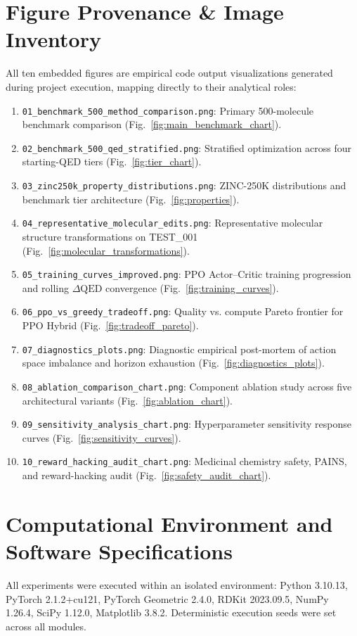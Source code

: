 \documentclass{ieeeaccess}
\begin{document}
\appendices
\section{Figure Provenance \& Image Inventory}
\label{sec:appendix_figures}
All ten embedded figures are empirical code output visualizations generated during project execution, mapping directly to their analytical roles:
\begin{enumerate}
    \item \texttt{01\_benchmark\_500\_method\_comparison.png}: Primary 500-molecule benchmark comparison (Fig.~\ref{fig:main_benchmark_chart}).
    \item \texttt{02\_benchmark\_500\_qed\_stratified.png}: Stratified optimization across four starting-QED tiers (Fig.~\ref{fig:tier_chart}).
    \item \texttt{03\_zinc250k\_property\_distributions.png}: ZINC-250K distributions and benchmark tier architecture (Fig.~\ref{fig:properties}).
    \item \texttt{04\_representative\_molecular\_edits.png}: Representative molecular structure transformations on TEST\_001 (Fig.~\ref{fig:molecular_transformations}).
    \item \texttt{05\_training\_curves\_improved.png}: PPO Actor--Critic training progression and rolling $\Delta\text{QED}$ convergence (Fig.~\ref{fig:training_curves}).
    \item \texttt{06\_ppo\_vs\_greedy\_tradeoff.png}: Quality vs. compute Pareto frontier for PPO Hybrid (Fig.~\ref{fig:tradeoff_pareto}).
    \item \texttt{07\_diagnostics\_plots.png}: Diagnostic empirical post-mortem of action space imbalance and horizon exhaustion (Fig.~\ref{fig:diagnostics_plots}).
    \item \texttt{08\_ablation\_comparison\_chart.png}: Component ablation study across five architectural variants (Fig.~\ref{fig:ablation_chart}).
    \item \texttt{09\_sensitivity\_analysis\_chart.png}: Hyperparameter sensitivity response curves (Fig.~\ref{fig:sensitivity_curves}).
    \item \texttt{10\_reward\_hacking\_audit\_chart.png}: Medicinal chemistry safety, PAINS, and reward-hacking audit (Fig.~\ref{fig:safety_audit_chart}).
\end{enumerate}

\section{Computational Environment and Software Specifications}
\label{sec:appendix_env}
All experiments were executed within an isolated environment: Python 3.10.13, PyTorch 2.1.2+cu121, PyTorch Geometric 2.4.0, RDKit 2023.09.5, NumPy 1.26.4, SciPy 1.12.0, Matplotlib 3.8.2. Deterministic execution seeds were set across all modules.
\end{document}
